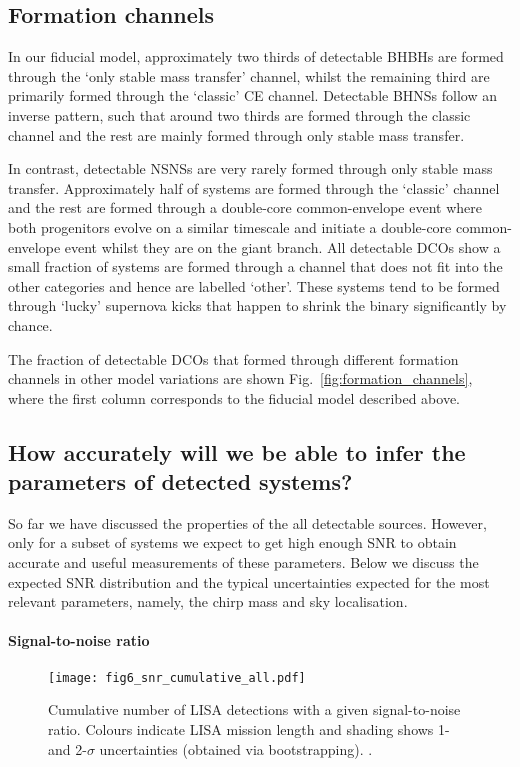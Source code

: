 \subsection{Formation channels}\label{sec:progenitors_and_formation}
In our fiducial model, approximately two thirds of detectable BHBHs are formed through the `only stable mass transfer' channel, whilst the remaining third are primarily formed through the `classic' CE channel. Detectable BHNSs follow an inverse pattern, such that around two thirds are formed through the classic channel and the rest are mainly formed through only stable mass transfer.

In contrast, detectable NSNSs are very rarely formed through only stable mass transfer. Approximately half of systems are formed through the `classic' channel and the rest are formed through a double-core common-envelope event \citep{Brown+1995} where both progenitors evolve on a similar timescale and initiate a double-core common-envelope event whilst they are on the giant branch. All detectable DCOs show a small fraction of systems are formed through a channel that does not fit into the other categories and hence are labelled `other'. These systems tend to be formed through `lucky' supernova kicks that happen to shrink the binary significantly by chance.

The fraction of detectable DCOs that formed through different formation channels in other model variations are shown Fig.~\ref{fig:formation_channels}, where the first column corresponds to the fiducial model described above.

\subsection{How accurately will we be able to infer the parameters of detected systems?}\label{sec:measurement_uncertainties}
So far we have discussed the properties of the all detectable sources. However, only for a subset of systems we expect to get high enough SNR to obtain accurate and useful measurements of these parameters. Below we discuss the expected SNR distribution and the typical uncertainties expected for the most relevant parameters, namely, the chirp mass and sky localisation.

\paragraph{Signal-to-noise ratio}

\begin{figure}[tb]
    \centering
    \texttt{[image: fig6\_snr\_cumulative\_all.pdf]}
    \caption{Cumulative number of LISA detections with a given signal-to-noise ratio. Colours indicate LISA mission length and shading shows 1- and 2-$\sigma$ uncertainties (obtained via bootstrapping). \href{https://github.com/TomWagg/detecting-DCOs-in-LISA/blob/main/paper/figures/fig6_snr_cumulative_all.pdf}{\faFileImage} \href{https://github.com/TomWagg/detecting-DCOs-in-LISA/blob/main/paper/figure_notebooks/fiducial.ipynb}{\faBook}.}
    \label{fig:snr_dist}
\end{figure}

